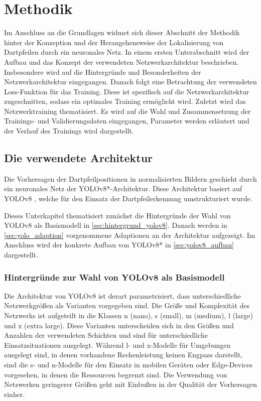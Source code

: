 
\section{Methodik}
\label{sec:ki:methodik}

Im Anschluss an die Grundlagen widmet sich dieser Abschnitt der Methodik hinter der Konzeption und der Herangehensweise der Lokalisierung von Dartpfeilen durch ein neuronales Netz. In einem ersten Unterabschnitt wird der Aufbau und das Konzept der verwendeten Netzwerkarchitektur beschrieben. Insbesondere wird auf die Hintergründe und Besonderheiten der Netzwerkarchitektur eingegangen. Danach folgt eine Betrachtung der verwendeten Loss-Funktion für das Training. Diese ist spezifisch auf die Netzwerkarchitektur zugeschnitten, sodass ein optimales Training ermöglicht wird. Zuletzt wird das Netzwerktraining thematisiert. Es wird auf die Wahl und Zusammensetzung der Trainings- und Validierungsdaten eingegangen, Parameter werden erläutert und der Verlauf des Trainings wird dargestellt.


\subsection{Die verwendete Architektur}
\label{sec:warum_yolov8}

Die Vorhersagen der Dartpfeilpositionen in normalisierten Bildern geschieht durch ein neuronales Netz der YOLOv8*-Architektur. Diese Architektur basiert auf YOLOv8 \cite{yolov8_paper}, welche für den Einsatz der Dartpfeilerkennung umstrukturiert wurde.

Dieses Unterkapitel thematisiert zunächst die Hintergründe der Wahl von YOLOv8 als Basismodell in \autoref{sec:hintergrund_yolov8}. Danach werden in \autoref{sec:yolo_adaption} vorgenommene Adaptionen an der Architektur aufgezeigt. Im Anschluss wird der konkrete Aufbau von YOLOv8* in \autoref{sec:yolov8_aufbau} dargestellt.

\subsubsection{Hintergründe zur Wahl von YOLOv8 als Basismodell}
\label{sec:hintergrund_yolov8}

Die Architektur von YOLOv8 ist derart parametrisiert, dass unterschiedliche Netzwerkgrößen als Varianten vorgegeben sind. Die Größe und Komplexität des Netzwerks ist aufgeteilt in die Klassen n (nano), s (small), m (medium), l (large) und x (extra large). Diese Varianten unterscheiden sich in den Größen und Anzahlen der verwendeten Schichten und sind für unterschiedliche Einsatzsituationen ausgelegt. Während l- und x-Modelle für Umgebungen ausgelegt sind, in denen vorhandene Rechenleistung keinen Engpass darstellt, sind die s- und n-Modelle für den Einsatz in mobilen Geräten oder Edge-Devices vorgesehen, in denen die Ressourcen begrenzt sind. Die Verwendung von Netzwerken geringerer Größen geht mit Einbußen in der Qualität der Vorhersagen einher.

